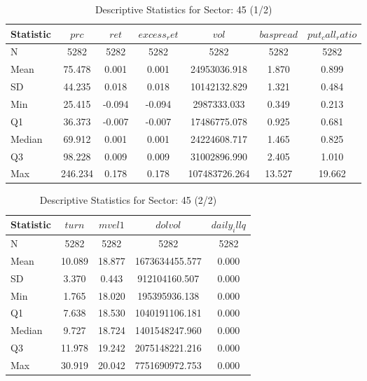     \begin{table}[ht]
    \centering

    
    \caption{Descriptive Statistics for Sector: 45 (1/2)}
    \label{tab:sec45_a}
    
    \begin{tabular}{lcccccc}
    \toprule
    Statistic & $prc$ & $ret$ & $excess_ret$ & $vol$ & $baspread$ & $put_call_ratio$ \\\midrule
    N & 5282 & 5282 & 5282 & 5282 & 5282 & 5282 \\
    Mean & 75.478 & 0.001 & 0.001 & 24953036.918 & 1.870 & 0.899 \\
    SD & 44.235 & 0.018 & 0.018 & 10142132.829 & 1.321 & 0.484 \\
    Min & 25.415 & -0.094 & -0.094 & 2987333.033 & 0.349 & 0.213 \\
    Q1 & 36.373 & -0.007 & -0.007 & 17486775.078 & 0.925 & 0.681 \\
    Median & 69.912 & 0.001 & 0.001 & 24224608.717 & 1.465 & 0.825 \\
    Q3 & 98.228 & 0.009 & 0.009 & 31002896.990 & 2.405 & 1.010 \\
    Max & 246.234 & 0.178 & 0.178 & 107483726.264 & 13.527 & 19.662 \\
    \bottomrule
    \end{tabular}

    \end{table}
    
    \begin{table}[ht]
    \centering

    
    \caption{Descriptive Statistics for Sector: 45 (2/2)}
    \label{tab:sec45_b}
    
    \begin{tabular}{lcccc}
    \toprule
    Statistic & $turn$ & $mvel1$ & $dolvol$ & $daily_illq$ \\\midrule
    N & 5282 & 5282 & 5282 & 5282 \\
    Mean & 10.089 & 18.877 & 1673634455.577 & 0.000 \\
    SD & 3.370 & 0.443 & 912104160.507 & 0.000 \\
    Min & 1.765 & 18.020 & 195395936.138 & 0.000 \\
    Q1 & 7.638 & 18.530 & 1040191106.181 & 0.000 \\
    Median & 9.727 & 18.724 & 1401548247.960 & 0.000 \\
    Q3 & 11.978 & 19.242 & 2075148221.216 & 0.000 \\
    Max & 30.919 & 20.042 & 7751690972.753 & 0.000 \\
    \bottomrule
    \end{tabular}

    \end{table}
    
